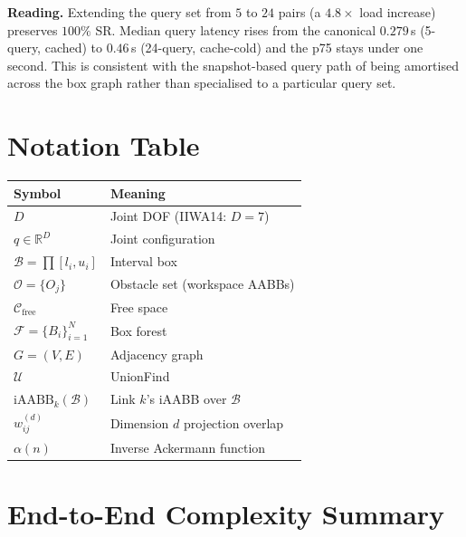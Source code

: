 \documentclass[journal]{IEEEtran}
\newcommand{\iAABB}{\mathrm{iAABB}}
\newcommand{\Real}{\mathbb{R}}
\newcommand{\Cfree}{\mathcal{C}_{\mathrm{free}}}
\newcommand{\calO}{\mathcal{O}}
\newcommand{\calF}{\mathcal{F}}
\begin{document}
\noindent\textbf{Reading.}
Extending the query set from $5$ to $24$ pairs (a $4.8\times$ load
increase) preserves $100\%$ SR. Median query latency rises from the
canonical $0.279$\,s (5-query, cached) to $0.46$\,s
(24-query, cache-cold) and the p75 stays under one second. This
is consistent with the snapshot-based query path of
 being amortised across the box graph rather than
specialised to a particular query set.

\section{Notation Table}\label{app:notation}

\begin{table}[ht]
\centering
\small
\begin{tabular}{@{}ll@{}}
\toprule
\textbf{Symbol} & \textbf{Meaning} \\
\midrule
$D$ & Joint DOF (IIWA14: $D=7$) \\
$q \in \Real^D$ & Joint configuration \\
$\mathcal{B} = \prod [l_i, u_i]$ & Interval box \\
$\calO = \{O_j\}$ & Obstacle set (workspace AABBs) \\
$\Cfree$ & Free space \\
$\calF = \{B_i\}_{i=1}^N$ & Box forest \\
$G = (V, E)$ & Adjacency graph \\
$\mathcal{U}$ & UnionFind \\
$\iAABB_k(\mathcal{B})$ & Link $k$'s iAABB over $\mathcal{B}$ \\
$w_{ij}^{(d)}$ & Dimension $d$ projection overlap \\
$\alpha(n)$ & Inverse Ackermann function \\
\bottomrule
\end{tabular}
\end{table}

\section{End-to-End Complexity Summary}\label{app:complexity}
\end{document}
